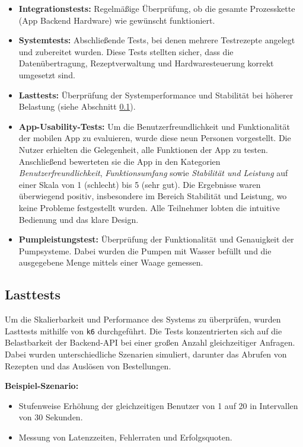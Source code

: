 \begin{itemize}
  \item \textbf{Integrationstests:} Regelmäßige Überprüfung, ob die gesamte Prozesskette 
    (App \textrightarrow{} Backend \textrightarrow{} Hardware) wie gewünscht funktioniert.
  \item \textbf{Systemtests:} Abschließende Tests, bei denen mehrere Testrezepte angelegt und 
    zubereitet wurden. Diese Tests stellten sicher, dass die Datenübertragung, Rezeptverwaltung und 
    Hardwaresteuerung korrekt umgesetzt sind.
  \item \textbf{Lasttests:} Überprüfung der Systemperformance und Stabilität bei höherer Belastung 
    (siehe Abschnitt \ref{subsec:lasttests}).
  \item \textbf{App-Usability-Tests:} Um die Benutzerfreundlichkeit und Funktionalität der mobilen 
    App zu evaluieren, wurde diese neun Personen vorgestellt. Die Nutzer erhielten die Gelegenheit, 
    alle Funktionen der App zu testen. Anschließend bewerteten sie die App in den Kategorien 
    \textit{Benutzerfreundlichkeit}, \textit{Funktionsumfang} sowie \textit{Stabilität und Leistung} 
    auf einer Skala von 1 (schlecht) bis 5 (sehr gut). Die Ergebnisse waren überwiegend positiv, 
    insbesondere im Bereich Stabilität und Leistung, wo keine Probleme festgestellt wurden. Alle 
    Teilnehmer lobten die intuitive Bedienung und das klare Design.
  \item \textbf{Pumpleistungstest:} Überprüfung der Funktionalität und Genauigkeit der Pumpsysteme. 
    Dabei wurden die Pumpen mit Wasser befüllt und die ausgegebene Menge mittels einer Waage 
    gemessen.
\end{itemize}

\subsection{Lasttests}
\label{subsec:lasttests}

Um die Skalierbarkeit und Performance des Systems zu überprüfen, wurden Lasttests mithilfe von 
\texttt{k6} durchgeführt. Die Tests konzentrierten sich auf die Belastbarkeit der Backend-API bei 
einer großen Anzahl gleichzeitiger Anfragen. Dabei wurden unterschiedliche Szenarien simuliert, 
darunter das Abrufen von Rezepten und das Auslösen von Bestellungen.\newline

\textbf{Beispiel-Szenario:}
\begin{itemize}
  \item Stufenweise Erhöhung der gleichzeitigen Benutzer von 1 auf 20 in Intervallen von 30 Sekunden.
  \item Messung von Latenzzeiten, Fehlerraten und Erfolgsquoten.
\end{itemize}

